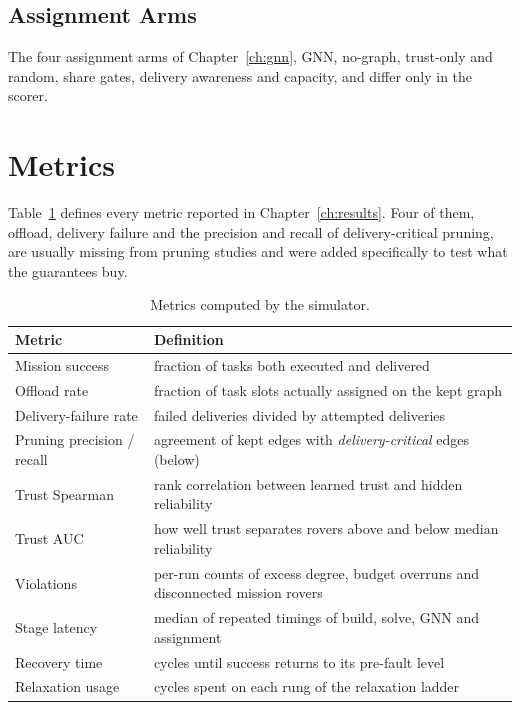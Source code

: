 \subsection{Assignment Arms}

The four assignment arms of Chapter~\ref{ch:gnn}, GNN, no-graph, trust-only
and random, share gates, delivery awareness and capacity, and differ only in
the scorer.

\section{Metrics}

Table~\ref{tab:sim:metrics} defines every metric reported in
Chapter~\ref{ch:results}. Four of them, offload, delivery failure and the
precision and recall of delivery-critical pruning, are usually missing from
pruning studies and were added specifically to test what the guarantees buy.

\begin{table}[htbp]
\centering
\caption{Metrics computed by the simulator.}
\label{tab:sim:metrics}
\small
\begin{tabularx}{\linewidth}{@{}l X@{}}
\toprule
Metric & Definition \\
\midrule
Mission success & fraction of tasks both executed and delivered \\
Offload rate & fraction of task slots actually assigned on the kept graph \\
Delivery-failure rate & failed deliveries divided by attempted deliveries \\
Pruning precision / recall & agreement of kept edges with \emph{delivery-critical} edges (below) \\
Trust Spearman & rank correlation between learned trust and hidden reliability \\
Trust AUC & how well trust separates rovers above and below median reliability \\
Violations & per-run counts of excess degree, budget overruns and disconnected mission rovers \\
Stage latency & median of repeated timings of build, solve, GNN and assignment \\
Recovery time & cycles until success returns to its pre-fault level \\
Relaxation usage & cycles spent on each rung of the relaxation ladder \\
\bottomrule
\end{tabularx}
\end{table}

